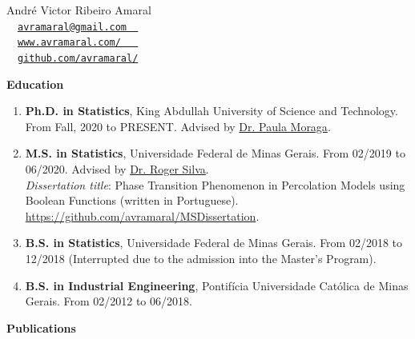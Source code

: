 \documentclass[11pt, ]{article}
\begin{document}
	
	\begin{center}
		{\LARGE André Victor Ribeiro Amaral} \\ \vspace{6pt}
		{\small\faEnvelope~~\href{mailto:avramaral@gmail.com}{\texttt{avramaral@gmail.com~~}}} \\
		{\small\faDesktop~~\href{https://www.avramaral.com/}{\texttt{www.avramaral.com/~~~}}}	\\
		{\small\faGithubAlt~~\href{https://github.com/avramaral/}{\texttt{github.com/avramaral/}}}	
	\end{center}

{\Large \textbf{Education}}

	\begin{enumerate}
		\item \textbf{Ph.D. in Statistics}, King Abdullah University of Science and Technology. From Fall, 2020 to PRESENT. Advised by \href{https://www.paulamoraga.com/}{Dr. Paula Moraga}.
		
		\item \textbf{M.S. in Statistics}, Universidade Federal de Minas Gerais. From 02/2019 to 06/2020. Advised by \href{http://www.est.ufmg.br/~rogerwcs/}{Dr. Roger Silva}. \\
		\textit{Dissertation title}: Phase Transition Phenomenon in Percolation Models using Boolean Functions (written in Portuguese). \href{https://github.com/avramaral/MSDissertation}{\url{https://github.com/avramaral/MSDissertation}}.
		
		\item \textbf{B.S. in Statistics}, Universidade Federal de Minas Gerais. From 02/2018 to 12/2018 (Interrupted due to the admission into the Master's Program).
		
		\item \textbf{B.S. in Industrial Engineering}, Pontifícia Universidade Católica de Minas Gerais. From 02/2012 to 06/2018.
	
	\end{enumerate}

\vspace{6pt}

{\Large \textbf{Publications}} 
	
	
	\vspace{9pt}
\end{document}
